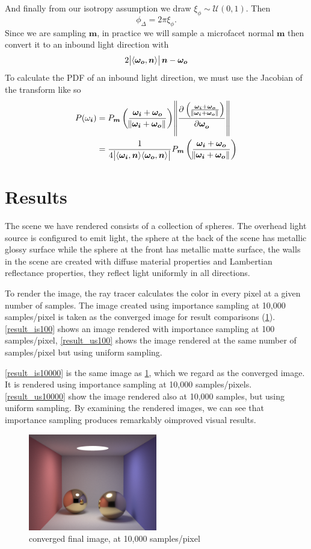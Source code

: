 \documentclass[12pt]{article}
\DeclarePairedDelimiter\ip{\langle }{\rangle}
\begin{document}
And finally from our isotropy assumption we draw \(\xi_\phi \sim \mathcal{U}(0, 1)\).
Then
\[\phi_\Delta = 2\pi\xi_\phi .\]
Since we are sampling \(\bm m\), in practice we will sample a microfacet normal \( \bm m\) then convert it to an inbound light direction with \autocite{taylor_2016}
\[2\abs{\ip{\bm{\omega_o}, \bm n}}\bm n-  \bm{\omega_o}\]
To calculate the PDF of an inbound light direction, we must use the Jacobian of the transform like so
\begin{align*}
  P(\omega_{\bm i}) &= P_{\bm m}\del{\frac{\bm{\omega_i} + \bm{\omega_o}}{\norm{\bm{\omega_i} + \bm{\omega_o}}} } \norm{\dpd{\del{\frac{\bm{\omega_i} + \bm{\omega_o}}{\norm{\bm{\omega_i} + \bm{\omega_o}}}}}{\bm{\omega_o}}}\\
   &= \frac{1}{4\abs{\ip{\bm{\omega_i}, \bm n}\ip{\bm{\omega_o}, \bm n}}}P_{\bm m}\del{\frac{\bm{\omega_i} + \bm{\omega_o}}{\norm{\bm{\omega_i} + \bm{\omega_o}}} }
\end{align*}
\section{Results}
The scene we have rendered consists of a collection of spheres. The overhead light source is configured to emit light, the sphere at the back of the scene has metallic glossy surface while the sphere at the front has metallic matte surface, the walls in the scene are created with diffuse material properties and Lambertian reflectance properties, they reflect light uniformly in all directions.

To render the image, the ray tracer calculates the color in every pixel at a given number of samples.
The image created using importance sampling at 10,000 samples/pixel is taken as the converged image for result comparisons (\cref{result_converged}).
\cref{result_is100} shows an image rendered with importance sampling at 100 samples/pixel, \cref{result_us100} shows the image rendered at the same number of samples/pixel but using uniform sampling.

\cref{result_is10000} is the same image as \ref{result_converged}, which we regard as the converged image.
It is rendered using importance sampling at 10,000 samples/pixels.
\cref{result_us10000} show the image rendered also at 10,000 samples, but using uniform sampling.
By examining the rendered images, we can see that importance sampling produces remarkably oimproved visual results.

\begin{figure}[ht]
  \centering
  \includegraphics[width=0.5\textwidth]{convergedIS.png}
  \caption{converged final image, at 10,000 samples/pixel}
  \label{result_converged}
\end{figure}
\end{document}
